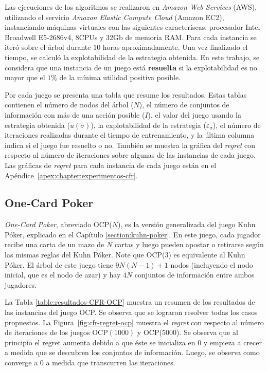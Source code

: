 Las ejecuciones de los algoritmos se realizaron en \textit{Amazon Web Services} (AWS), utilizando el servicio \textit{Amazon Elastic Compute Cloud} (Amazon EC2), instanciando máquinas virtuales con las siguientes caracteríscas: procesador Intel Broadwell E5-2686v4, 8CPUs y 32Gb de memoria RAM. Para cada instancia se iteró sobre el árbol durante $10$ horas aproximadamente. Una vez finalizado el tiempo, se calculó la explotabilidad de la estrategia obtenida. En este trabajo, se considera que una instancia de un juego está \textbf{resuelta} si la explotabilidad es no mayor que el $1\%$ de la mínima utilidad positiva posible.

Por cada juego se presenta una tabla que resume los resultados. Estas tablas contienen el número de nodos del árbol ($N$), el número de conjuntos de información con más de una acción posible ($I$), el valor del juego usando la estrategia obtenida ($u({\sigma})$), la explotabilidad de la estrategia ($\varepsilon_{\sigma}$), el número de iteraciones realizadas durante el tiempo de entrenamiento, y la última columna indica si el juego fue resuelto o no. También se muestra la gráfica del \textit{regret} con respecto al número de iteraciones sobre algunas de las instancias de cada juego. Las gráficas de \textit{regret} para cada instancia de cada juego están en el Apéndice~\ref{apex:chapter:experimentos-cfr}.

\subsection*{One-Card Poker}
\textit{One-Card Poker}, abreviado OCP($N$), es la versión generalizada del juego Kuhn Póker, explicado en el Capítulo \ref{section:kuhn-poker}. En este juego, cada jugador recibe una carta de un mazo de $N$ cartas y luego pueden apostar o retirarse según las mismas reglas del Kuhn Póker. Note que OCP(3) es equivalente al Kuhn Póker. El árbol de este juego tiene $9N(N-1)+1$ nodos (incluyendo el nodo inicial, que es el nodo de azar) y hay $4N$ conjuntos de información entre ambos jugadores. 

La Tabla \ref{table:resultados-CFR-OCP} muestra un resumen de los resultados de las instancias del juego OCP. Se observa que se lograron resolver todas los casos propuestos. La Figura~\ref{fig:cfr-regret-ocp} muestra el \textit{regret} con respecto al número de iteraciones de los juegos OCP$(1000)$ y OCP($5000$). Se observa que al principio el regret aumenta debido a que éste se inicializa en $0$ y empieza a crecer a medida que se descubren los conjuntos de información. Luego, se observa como converge a $0$ a medida que transcurren las iteraciones.

